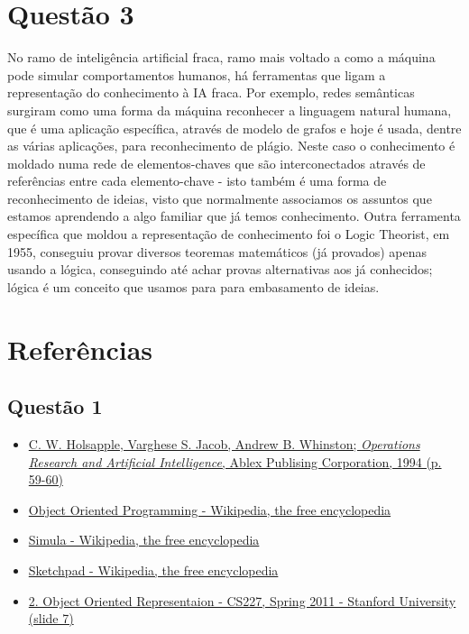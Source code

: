 \documentclass{article}
\begin{document}
\section*{Questão 3}
    No ramo de inteligência artificial fraca, ramo mais voltado a como a
    máquina pode simular comportamentos humanos, há ferramentas que ligam a
    representação do conhecimento à IA fraca. Por exemplo, redes semânticas
    surgiram como uma forma da máquina reconhecer a linguagem natural humana,
    que é uma aplicação específica, através de modelo de grafos e hoje é usada,
    dentre as várias aplicações, para reconhecimento de plágio. Neste caso o
    conhecimento é moldado numa rede de elementos-chaves que são
    interconectados através de referências entre cada elemento-chave - isto
    também é uma forma de reconhecimento de ideias, visto que normalmente
    associamos os assuntos que estamos aprendendo a algo familiar que já temos
    conhecimento. Outra ferramenta específica que moldou a representação de
    conhecimento foi o Logic Theorist, em 1955, conseguiu provar diversos
    teoremas matemáticos (já provados) apenas usando a lógica, conseguindo até
    achar provas alternativas aos já conhecidos; lógica é um conceito que
    usamos para para embasamento de ideias.

\section*{Referências}
    \subsection*{Questão 1}
    \begin{itemize}
        \item
            \href{https://books.google.com.br/books?id=OKn2v__x-OwC&lpg=PP1&dq=Operations%20Research%20and%20Artificial%20Intelligence&hl=pt-BR&pg=PP1#v=onepage&q=Operations%20Research%20and%20Artificial%20Intelligence&f=false}{C.
            W. Holsapple, Varghese S. Jacob, Andrew B. Whinston;
            \textit{Operations Research and Artificial Intelligence}, Ablex
            Publising Corporation, 1994 (p. 59-60)}
        \item \href{https://en.wikipedia.org/wiki/Object-oriented_programming}{Object Oriented Programming - Wikipedia, the free encyclopedia}
        \item \href{https://en.wikipedia.org/wiki/Simula}{Simula - Wikipedia, the free encyclopedia}
        \item \href{https://en.wikipedia.org/wiki/Sketchpad}{Sketchpad - Wikipedia, the free encyclopedia}
        \item \href{http://web.stanford.edu/class/cs227/Lectures/lec02.pdf}{2. Object Oriented Representaion - CS227, Spring 2011 - Stanford University (slide 7)}
    \end{itemize}
    
\end{document}
